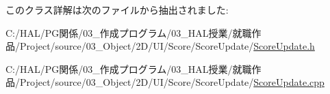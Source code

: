 このクラス詳解は次のファイルから抽出されました\+:\begin{DoxyCompactItemize}
\item 
C\+:/\+H\+A\+L/\+P\+G関係/03\+\_\+作成プログラム/03\+\_\+\+H\+A\+L授業/就職作品/\+Project/source/03\+\_\+\+Object/2\+D/\+U\+I/\+Score/\+Score\+Update/\mbox{\hyperlink{_score_update_8h}{Score\+Update.\+h}}\item 
C\+:/\+H\+A\+L/\+P\+G関係/03\+\_\+作成プログラム/03\+\_\+\+H\+A\+L授業/就職作品/\+Project/source/03\+\_\+\+Object/2\+D/\+U\+I/\+Score/\+Score\+Update/\mbox{\hyperlink{_score_update_8cpp}{Score\+Update.\+cpp}}\end{DoxyCompactItemize}
